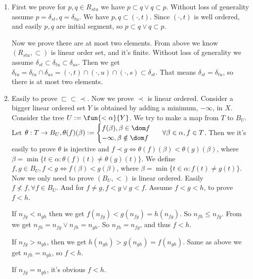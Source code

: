 \documentclass{ctexart}
\begin{document}
\begin{solution}
  \begin{enumerate}
    \item First we prove for \(p,q \in R_{stu} \) we have \(p \subset q \vee q \subset p\). 
      Without loss of generality assume \(p = \delta_{st} ,q=\delta_{tu} \). We have 
      \(p,q \subset (\cdot, t)\). Since \((\cdot,t)\) is well ordered, and easily \(p,q\) are initial segment, 
      so \(p \subset q \vee q \subset p\). 

      Now we prove there are at most two elements. 
      From above we know \((R_{stu},\subset)\) is linear order set, and it's finite. 
      Without loss of generality we assume \(\delta_{st} \subset \delta_{tu} \subset \delta_{us} \). 
      Then we get \(\delta_{tu}=\delta_{tu}\cap \delta_{us}=(\cdot,t)\cap(\cdot,u)\cap(\cdot,s) \subset \delta_{st}\).
      That means \(\delta_{st}=\delta_{tu}\), so there is at most two elements. 
    \item Easily to prove \(\sqsubset \subset \prec \). Now we prove \(\prec\) is linear ordered. 
      Consider a bigger linear ordered set \(Y\) is obtained by adding a minimum, \(-\infty\), in \(X\). 
      Consider the tree \(U:=\fun{<\alpha}{Y}\). We try to make a map from \(T\) to \(B_U\). 
      Let \(\theta:T \to B_U,\theta(f)(\beta):=\begin{cases}
        f(\beta), \beta \in \dom f\\
        -\infty,\beta \notin \dom f
      \end{cases}\,\,\, \forall \beta \in \alpha,f \in T\). 
      Then we it's easily to prove \(\theta\) is injective and \(f \prec g \iff \theta(f)(\beta)< \theta(g)(\beta)\), where \(\beta = \min\{t \in \alpha:\theta(f)(t) \neq \theta(g)(t)\}\). 
      We define \(f,g \in B_U,f <g \iff f(\beta)<g(\beta)\), where \(\beta=\min\{t \in \alpha:f(t)\neq g(t)\}\). 
      Now we only need to prove \((B_U,<)\) is linear ordered. 
      Easily \(f \not< f , \forall f \in B_U\). And for \(f \neq g,f<g \vee g<f\). 
      Assume \(f<g<h\), to prove \(f<h\).

      If \(n_{fg}< n_{gh} \) then we get \(f(n_{fg})<g(n_{fg})=h(n_{fg})\). 
      So \(n_{fh}\leq n_{fg}\). From  we get \(n_{fh}=n_{fg} \vee n_{fh}=n_{gh}\). 
      So \(n_{fh}=n_{fg}\), and thus \(f<h\). 

      If \(n_{fg}>n_{gh}\), then we get \(h(n_{gh})>g(n_{gh})=f(n_{gh})\). Same as above we get \(n_{fh}=n_{gh}\), so \(f<h\). 

      If \(n_{fg}=n_{gh}\), it's obvious \(f<h\). 
      

\end{enumerate}
\end{solution}
\end{document}
